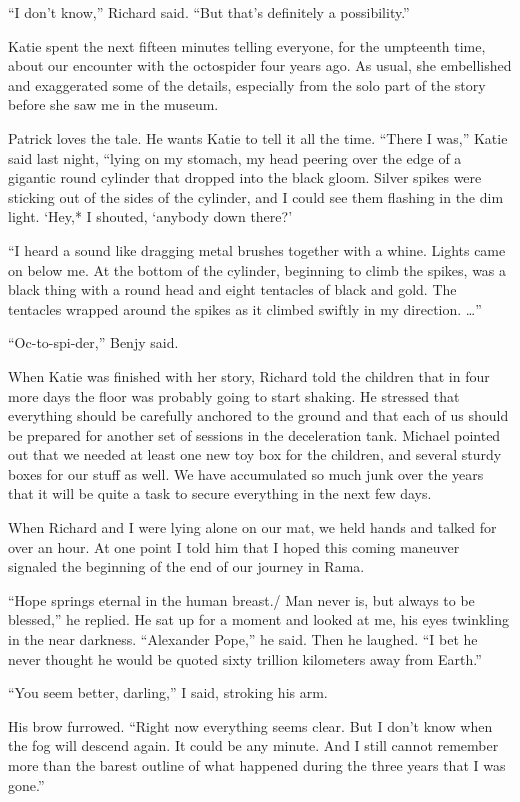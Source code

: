 \documentclass[]{article}
\begin{document}
{“I don’t know,” Richard said. “But that’s definitely a possibility.”

Katie spent the next fifteen minutes telling everyone, for the umpteenth time, about our encounter with the octospider four years ago. As usual, she embellished and exaggerated some of the details, especially from the solo part of the story before she saw me in the museum.

Patrick loves the tale. He wants Katie to tell it all the time. “There I was,” Katie said last night, “lying on my stomach, my head peering over the edge of a gigantic round cylinder that dropped into the black gloom. Silver spikes were sticking out of the sides of the cylinder, and I could see them flashing in the dim light. ‘Hey,* I shouted, ‘anybody down there?’

“I heard a sound like dragging metal brushes together with a whine. Lights came on below me. At the bottom of the cylinder, beginning to climb the spikes, was a black thing with a round head and eight tentacles of black and gold. The tentacles wrapped around the spikes as it climbed swiftly in my direction. …”

“Oc-to-spi-der,” Benjy said.

When Katie was finished with her story, Richard told the children that in four more days the floor was probably going to start shaking. He stressed that everything should be carefully anchored to the ground and that each of us should be prepared for another set of sessions in the deceleration tank. Michael pointed out that we needed at least one new toy box for the children, and several sturdy boxes for our stuff as well. We have accumulated so much junk over the years that it will be quite a task to secure everything in the next few days.

When Richard and I were lying alone on our mat, we held hands and talked for over an hour. At one point I told him that I hoped this coming maneuver signaled the beginning of the end of our journey in Rama.

“Hope springs eternal in the human breast./ Man never is, but always to be blessed,” he replied. He sat up for a moment and looked at me, his eyes twinkling in the near darkness. “Alexander Pope,” he said. Then he laughed. “I bet he never thought he would be quoted sixty trillion kilometers away from Earth.”

“You seem better, darling,” I said, stroking his arm.

His brow furrowed. “Right now everything seems clear. But I don’t know when the fog will descend again. It could be any minute. And I still cannot remember more than the barest outline of what happened during the three years that I was gone.”

}
\end{document}

